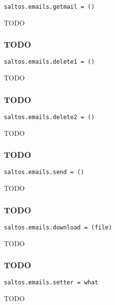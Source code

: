 \documentclass[a4paper]{article}
\begin{document}
\begin{lstlisting}
saltos.emails.getmail = ()
\end{lstlisting}

TODO

\hypertarget{toc23}{}
\subsubsection{TODO}

\begin{lstlisting}
saltos.emails.delete1 = ()
\end{lstlisting}

TODO

\hypertarget{toc24}{}
\subsubsection{TODO}

\begin{lstlisting}
saltos.emails.delete2 = ()
\end{lstlisting}

TODO

\hypertarget{toc25}{}
\subsubsection{TODO}

\begin{lstlisting}
saltos.emails.send = ()
\end{lstlisting}

TODO

\hypertarget{toc26}{}
\subsubsection{TODO}

\begin{lstlisting}
saltos.emails.download = (file)
\end{lstlisting}

TODO

\hypertarget{toc27}{}
\subsubsection{TODO}

\begin{lstlisting}
saltos.emails.setter = what
\end{lstlisting}

TODO
\end{document}
